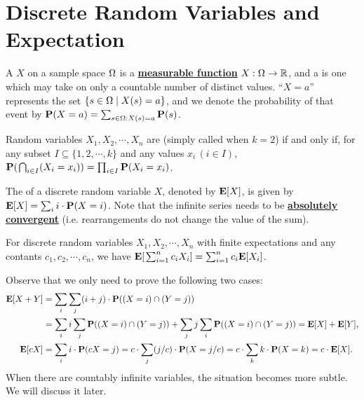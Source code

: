 \documentclass[main.tex]{subfiles}
\begin{document}
\minispacing

\section{Discrete Random Variables and Expectation}

A  $X$ on a sample space $\Omega$ is a \href{https://en.wikipedia.org/wiki/Measurable_function}{\bf measurable function} $X:\Omega \rightarrow \mathbb{R}$, and a  is one which may take on only a countable number of distinct values. ``$X=a$'' represents the set $\{s \in \Omega \mid X(s) = a\}$, and we denote the probability of that event by $\mathbf{P}(X=a)=\sum_{s\in\Omega:X(s)=a}\mathbf{P}(s)$.

Random variables $X_1,X_2,\cdots,X_n$ are  (simply called  when $k=2$) if and only if, for any subset $I \subseteq \{1,2,\cdots,k\}$ and any values $x_i\,(i\in I)$, $\mathbf{P}(\;\!\bigcap_{i\in I}(X_i=x_i))=\prod_{i\in I}\mathbf{P}(X_i=x_i)$.

The  of a discrete random variable $X$, denoted by $\mathbf{E}[X]$, is given by $\mathbf{E}[X]=\sum_{i} i \cdot \mathbf{P}(X=i)$. Note that the infinite series needs to be \href{https://en.wikipedia.org/wiki/Absolute_convergence}{\bf absolutely convergent} (i.e. rearrangements do not change the value of the sum).

\begin{theorem}
	For discrete random variables $X_1,X_2,\cdots,X_n$ with finite expectations and any contants $c_1,c_2,\cdots,c_n$,
	we have $\mathbf{E}[\;\!\sum_{i=1}^{n}c_iX_i]=\sum_{i=1}^{n}c_i\mathbf{E}[X_i]$.
\end{theorem}

\begin{pf}
	Observe that we only need to prove the following two cases:
	\begin{equation*}
		\begin{split}
			\mathbf{E}[X+Y]&=\sum_i\sum_j(i+j)\cdot\mathbf{P}((X=i)\cap(Y=j))\\
			&=\sum_ii\sum_j\mathbf{P}((X=i)\cap(Y=j))+\sum_jj\sum_i\mathbf{P}((X=i)\cap(Y=j))=\mathbf{E}[X]+\mathbf{E}[Y], \\
			\mathbf{E}[cX]&=\sum_ii\cdot\mathbf{P}(cX=j)=c\cdot\sum_j(j/c)\cdot\mathbf{P}(X=j/c)=c\cdot\sum_kk\cdot\mathbf{P}(X=k)=c\cdot \mathbf{E}[X].
		\end{split}
	\end{equation*}
	When there are countably infinite variables, the situation becomes more subtle. We will discuss it later.
\end{pf}
\end{document}
